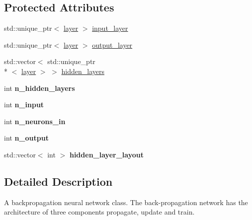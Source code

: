 \subsection*{Protected Attributes}
\begin{DoxyCompactItemize}
\item 
std\-::unique\-\_\-ptr$<$ \hyperlink{structlayer}{layer} $>$ \hyperlink{classbpnet_aeb161ecafe664d9f6e0d188b94c778f4}{input\-\_\-layer}
\item 
std\-::unique\-\_\-ptr$<$ \hyperlink{structlayer}{layer} $>$ \hyperlink{classbpnet_afc882a791c00244a5b5f0ff8badcbc1e}{output\-\_\-layer}
\item 
std\-::vector$<$ std\-::unique\-\_\-ptr\\*
$<$ \hyperlink{structlayer}{layer} $>$ $>$ \hyperlink{classbpnet_a9f1d31d7cdb034587768016a799c36f6}{hidden\-\_\-layers}
\item 
\hypertarget{classbpnet_aa4e55fef61fe2886ea6d860a1e4d63f4}{int {\bfseries n\-\_\-hidden\-\_\-layers}}\label{classbpnet_aa4e55fef61fe2886ea6d860a1e4d63f4}

\item 
\hypertarget{classbpnet_afa95293a45b21300a96d762f69232e2d}{int {\bfseries n\-\_\-input}}\label{classbpnet_afa95293a45b21300a96d762f69232e2d}

\item 
\hypertarget{classbpnet_a30a2996bef81fa705499d4f0d13574a7}{int {\bfseries n\-\_\-neurons\-\_\-in}}\label{classbpnet_a30a2996bef81fa705499d4f0d13574a7}

\item 
\hypertarget{classbpnet_a946bc26b407b7c75dc2b3ce58ed99e21}{int {\bfseries n\-\_\-output}}\label{classbpnet_a946bc26b407b7c75dc2b3ce58ed99e21}

\item 
\hypertarget{classbpnet_a9bb6a37050d988b4dda40d903c573ab0}{std\-::vector$<$ int $>$ {\bfseries hidden\-\_\-layer\-\_\-layout}}\label{classbpnet_a9bb6a37050d988b4dda40d903c573ab0}

\end{DoxyCompactItemize}


\subsection{Detailed Description}
A backpropagation neural network class. The back-\/propagation network has the architecture of three components propagate, update and train. 

